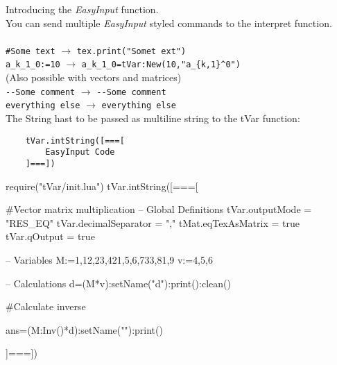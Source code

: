 \documentclass{article}
\begin{document}
	Introducing the \emph{EasyInput} function.\\
	You can send multiple \emph{EasyInput} styled commands to the interpret function.\\\\
	\verb|#Some text| $\rightarrow$ \verb|tex.print("Somet ext")|\\
	\verb|a_k_1_0:=10| $\rightarrow$  \verb|a_k_1_0=tVar:New(10,"a_{k,1}^0")|\\
	(Also possible with vectors and matrices)\\
	\verb|--Some comment| $\rightarrow$  \verb|--Some comment|\\
	\verb|everything else| $\rightarrow$  \verb|everything else| \\
	
	The String hast to be passed as multiline string to the tVar function:
	\begin{verbatim}
	tVar.intString([===[
		EasyInput Code
	]===])
	\end{verbatim}
\begin{luacode}
require("tVar/init.lua")
tVar.intString([===[

#Vector matrix multiplication
-- Global Definitions
tVar.outputMode = "RES_EQ"
tVar.decimalSeparator = ","
tMat.eqTexAsMatrix = true
tVar.qOutput = true

-- Variables
M:={{1,12,23},{421,5,6},{733,81,9}}
v:={4,5,6}

-- Calculations
d=(M*v):setName("d"):print():clean()

#Calculate inverse

ans=(M:Inv()*d):setName(""):print()

]===])	
\end{luacode}
\end{document}
